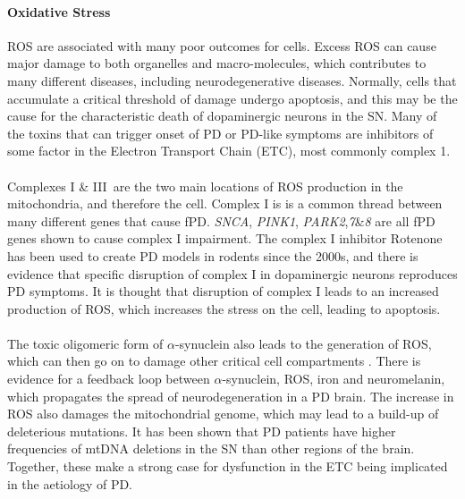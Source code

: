 \documentclass{article}
\begin{document}
\paragraph{Oxidative Stress}
\label{para:oxidative}
ROS are associated with many poor outcomes for cells. Excess ROS can cause major damage to both organelles and macro-molecules, which contributes to many different diseases, including neurodegenerative diseases\cite{Brieger2012ReactiveDisease}. Normally, cells that accumulate a critical threshold of damage undergo apoptosis, and this may be the cause for the characteristic death of dopaminergic neurons in the SN\cite{Subramaniam2013MitochondrialDisease}. Many of the toxins that can trigger onset of PD or PD-like symptoms are inhibitors of some factor in the Electron Transport Chain (ETC), most commonly complex 1\cite{Subramaniam2013MitochondrialDisease}.
\\
\\Complexes I & III\ are the two main locations of ROS production in the mitochondria\cite{Murphy2009HowSpecies}, and therefore the cell. Complex I is is a common thread between many different genes that cause fPD. \textit{SNCA}, \textit{PINK1}, \textit{PARK2},\textit{7}\&\textit{8} are all fPD genes shown to cause complex I impairment\cite{Subramaniam2013MitochondrialDisease}. The complex I inhibitor Rotenone has been used to create PD models in rodents since the 2000s\cite{Betarbet2000ChronicDisease}, and there is evidence that specific disruption of complex I in dopaminergic neurons reproduces PD symptoms\cite{Gonzalez-Rodriguez2021DisruptionParkinsonism}. It is thought that disruption of complex I leads to an increased production of ROS, which increases the stress on the cell, leading to apoptosis\cite{Subramaniam2013MitochondrialDisease}.
\\
\\The toxic oligomeric form of $\alpha$-synuclein also leads to the generation of ROS, which can then go on to damage other critical cell compartments \cite{Choi2022PathologicalToxicity}. There is evidence for a feedback loop between $\alpha$-synuclein, ROS, iron and neuromelanin, which propagates the spread of neurodegeneration in a PD brain\cite{JansenvanRensburg2021ToxicTurmeric}. The increase in ROS also damages the mitochondrial genome, which may lead to a build-up of deleterious mutations. It has been shown that PD patients have higher frequencies of mtDNA deletions in the SN than other regions of the brain\cite{Bender2006HighDisease}. Together, these make a strong case for dysfunction in the ETC being implicated in the aetiology of PD.
\end{document}
